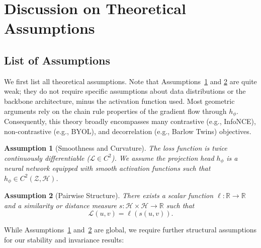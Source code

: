 \documentclass{article}
\theoremstyle{plain}
\newtheorem{assumption}{Assumption}
\theoremstyle{definition}
\theoremstyle{remark}
\begin{document}




\newpage
\appendix
\onecolumn

\section{Discussion on Theoretical Assumptions}
\label{app:assumptions}

\subsection{List of Assumptions}

We first list all theoretical assumptions. Note that Assumptions~\ref{ass:regularity} and \ref{ass:pairwise} are quite weak; they do not require specific assumptions about data distributions or the backbone architecture, minus the activation function used. Most geometric arguments rely on the chain rule properties of the gradient flow through $h_\phi$. Consequently, this theory broadly encompasses many contrastive (e.g., InfoNCE), non-contrastive (e.g., BYOL), and decorrelation (e.g., Barlow Twins) objectives.

\begin{assumption}[Smoothness and Curvature]
\label{ass:regularity}
The loss function is twice continuously differentiable ($\mathcal{L} \in C^2$). We assume the projection head $h_\phi$ is a neural network equipped with smooth activation functions such that $h_\phi \in C^2(\mathcal{Z}, \mathcal{H})$. 
\end{assumption}

\begin{assumption}[Pairwise Structure]
\label{ass:pairwise}
There exists a scalar function $\ell : \mathbb{R} \to \mathbb{R}$ and a similarity or distance measure $s : \mathcal{H} \times \mathcal{H} \to \mathbb{R}$ such that
\begin{equation*}
    \mathcal L(u,v) = \ell(s(u,v)).
\end{equation*}
\end{assumption}

While Assumptions~\ref{ass:regularity} and~\ref{ass:pairwise} are global, we require further structural assumptions for our stability and invariance results:
\end{document}
